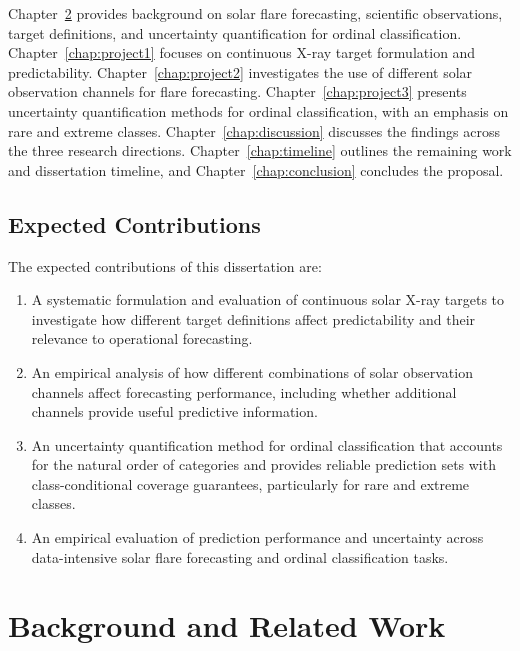 \documentclass[12pt]{report}
\begin{document}
Chapter~\ref{chap:background} provides background on solar flare forecasting, scientific observations, target definitions, and uncertainty quantification for ordinal classification. Chapter~\ref{chap:project1} focuses on continuous X-ray target formulation and predictability. Chapter~\ref{chap:project2} investigates the use of different solar observation channels for flare forecasting. Chapter~\ref{chap:project3} presents uncertainty quantification methods for ordinal classification, with an emphasis on rare and extreme classes. Chapter~\ref{chap:discussion} discusses the findings across the three research directions. Chapter~\ref{chap:timeline} outlines the remaining work and dissertation timeline, and Chapter~\ref{chap:conclusion} concludes the proposal.


\section{Expected Contributions}

The expected contributions of this dissertation are:

\begin{enumerate}
    \item A systematic formulation and evaluation of continuous solar X-ray targets to investigate how different target definitions affect predictability and their relevance to operational forecasting.

    \item An empirical analysis of how different combinations of solar observation channels affect forecasting performance, including whether additional channels provide useful predictive information.

    \item An uncertainty quantification method for ordinal classification that accounts for the natural order of categories and provides reliable prediction sets with class-conditional coverage guarantees, particularly for rare and extreme classes.

    \item An empirical evaluation of prediction performance and uncertainty across data-intensive solar flare forecasting and ordinal classification tasks.
\end{enumerate}

\chapter{Background and Related Work}
\label{chap:background}
\end{document}
